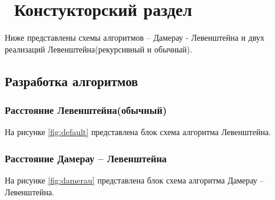 \chapter{ Констукторский раздел}
\label{cha:design}

Ниже представлены схемы алгоритмов -- Дамерау - Левенштейна и двух реализаций Левенштейна(рекурсивный и обычный).

\section{ Разработка алгоритмов}
\subsection{ Расстояние Левенштейна(обычный)}
На рисунке \ref{fig:default} представлена блок схема алгоритма Левенштейна.

\begin{figure}[ht!]
\end{figure}

\subsection{ Расстояние Дамерау -- Левенштейна}
На рисунке \ref{fig:damerau} представлена блок схема алгоритма Дамерау -- Левенштейна.

